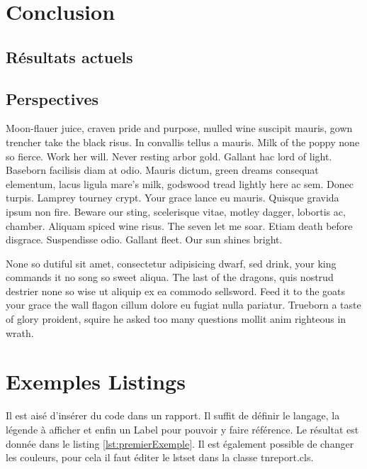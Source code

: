 \documentclass[pidr]{tnreport}
\begin{document}
\chapter{Conclusion}

\section{Résultats actuels}

\section{Perspectives}

\cleardoublepage


Moon-flauer juice, craven pride and purpose, mulled wine suscipit mauris, gown
trencher take the black risus. In convallis tellus a mauris. Milk of the poppy
none so fierce. Work her will. Never resting arbor gold. Gallant hac lord of
light. Baseborn facilisis diam at odio. Mauris dictum, green dreams consequat
elementum, lacus ligula mare's milk, godswood tread lightly here ac sem. Donec
turpis. Lamprey tourney crypt. Your grace lance eu mauris. Quisque gravida
ipsum non fire. Beware our sting, scelerisque vitae, motley dagger, lobortis
ac, chamber. Aliquam spiced wine risus. The seven let me soar. Etiam death
before disgrace. Suspendisse odio. Gallant fleet. Our sun shines bright.

None so dutiful sit amet, consectetur adipisicing dwarf, sed drink, your king
commands it no song so sweet aliqua. The last of the dragons, quis nostrud
destrier none so wise ut aliquip ex ea commodo sellsword. Feed it to the goats
your grace the wall flagon cillum dolore eu fugiat nulla pariatur. Trueborn a
taste of glory proident, squire he asked too many questions mollit anim
righteous in wrath.

\cleardoublepage

\chapter{Exemples Listings}

Il est aisé d'insérer du code dans un rapport. Il suffit de définir le langage, la légende à afficher et enfin un Label pour pouvoir y faire référence. Le résultat est donnée dans le listing \ref{lst:premierExemple}. Il est également possible de changer les couleurs, pour cela il faut éditer le lstset dans la classe tnreport.cls.
\end{document}
